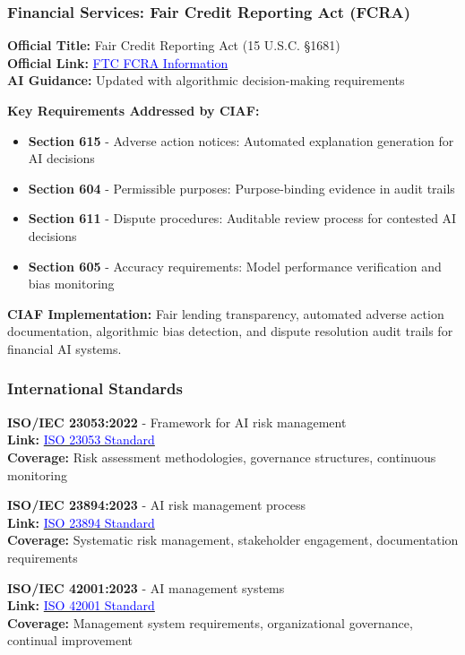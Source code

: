\documentclass[12pt,a4paper]{article}
\begin{document}
\subsubsection{Financial Services: Fair Credit Reporting Act (FCRA)}
\begin{technicalbox}
\textbf{Official Title:} Fair Credit Reporting Act (15 U.S.C. §1681)\\
\textbf{Official Link:} \href{https://www.ftc.gov/legal-library/browse/statutes/fair-credit-reporting-act}{\textcolor{blue}{FTC FCRA Information}}\\
\textbf{AI Guidance:} Updated with algorithmic decision-making requirements

\textbf{Key Requirements Addressed by CIAF:}
\begin{itemize}
\item \textbf{Section 615} - Adverse action notices: Automated explanation generation for AI decisions
\item \textbf{Section 604} - Permissible purposes: Purpose-binding evidence in audit trails
\item \textbf{Section 611} - Dispute procedures: Auditable review process for contested AI decisions
\item \textbf{Section 605} - Accuracy requirements: Model performance verification and bias monitoring
\end{itemize}

\textbf{CIAF Implementation:} Fair lending transparency, automated adverse action documentation, algorithmic bias detection, and dispute resolution audit trails for financial AI systems.
\end{technicalbox}

\subsubsection{International Standards}

\begin{valuebox}
\textbf{ISO/IEC 23053:2022} - Framework for AI risk management\\
\textbf{Link:} \href{https://www.iso.org/standard/74438.html}{\textcolor{blue}{ISO 23053 Standard}}\\
\textbf{Coverage:} Risk assessment methodologies, governance structures, continuous monitoring

\textbf{ISO/IEC 23894:2023} - AI risk management process\\
\textbf{Link:} \href{https://www.iso.org/standard/77304.html}{\textcolor{blue}{ISO 23894 Standard}}\\
\textbf{Coverage:} Systematic risk management, stakeholder engagement, documentation requirements

\textbf{ISO/IEC 42001:2023} - AI management systems\\
\textbf{Link:} \href{https://www.iso.org/standard/81230.html}{\textcolor{blue}{ISO 42001 Standard}}\\
\textbf{Coverage:} Management system requirements, organizational governance, continual improvement
\end{valuebox}
\end{document}
